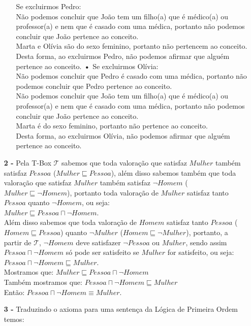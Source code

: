 \documentclass[12pt]{article}
\begin{document}
\begin{itemize}
\begin{itemize}
					Se excluirmos Pedro:\\
					Não podemos concluir que João tem um filho(a) que é médico(a) ou
					professor(a) e nem que é casado com uma médica, portanto não podemos concluir que João
					pertence ao conceito.\\
					Marta e Olívia são do sexo feminino, portanto não pertencem ao conceito.\\
					Desta forma, ao excluirmos Pedro, não podemos afirmar que alguém pertence ao
					conceito.
					\newline
					\subitem\textbf{•}
					Se excluirmos Olívia:\\
					Não podemos concluir que Pedro é casado com uma médica, portanto não podemos concluir que 
					Pedro pertence ao conceito.\\
					Não podemos concluir que João tem um filho(a) que é médico(a) ou
					professor(a) e nem que é casado com uma médica, portanto não podemos concluir que João
					pertence ao conceito.\\
					Marta é do sexo feminino, portanto não pertence ao conceito.\\
					Desta forma, ao excluirmos Olívia, não podemos afirmar que alguém pertence ao
					conceito.
			\end{itemize}
		\newpage
		\item[\textbf{2 -}]
			\hfill\newline
			Pela T-Box $\mathcal{T}$ sabemos que toda valoração que satisfaz $Mulher$ também satisfaz
			$Pessoa$ ($Mulher \sqsubseteq Pessoa$), além disso sabemos também que toda valoração
			que satisfaz $Mulher$ também satisfaz $\neg Homem$ ($Mulher \sqsubseteq \neg Homem$),
			portanto toda valoração de $Mulher$ satisfaz tanto $Pessoa$ quanto $\neg Homem$, ou seja:\\ 
			$Mulher \sqsubseteq Pessoa \sqcap \neg Homem$.\\
			
			Além disso sabemos que toda valoração de $Homem$ satisfaz tanto $Pessoa$ 
			($Homem \sqsubseteq Pessoa$) quanto $\neg Mulher$ ($Homem \sqsubseteq \neg Mulher$),
			portanto, a partir de $\mathcal{T}$, $\neg Homem$ deve satisfazer $\neg Pessoa$ ou
			$Mulher$, sendo assim $Pessoa \sqcap \neg Homem$ só pode ser satisfeito se $Mulher$
			for satisfeito, ou seja:\\
			$Pessoa \sqcap \neg Homem \sqsubseteq Mulher$.\\
			
			Mostramos que: $Mulher \sqsubseteq Pessoa \sqcap \neg Homem$\\
			Também mostramos que: $Pessoa \sqcap \neg Homem \sqsubseteq Mulher$\\
			Então: $Pessoa \sqcap \neg Homem \equiv Mulher$.
		\item[\textbf{3 -}]
			\hfill\newline
			Traduzindo o axioma para uma sentença da Lógica de Primeira Ordem temos:\\
			

\end{itemize}
\end{document}
